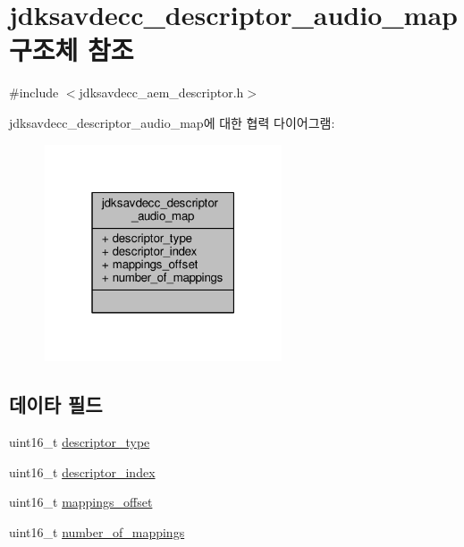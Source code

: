 \hypertarget{structjdksavdecc__descriptor__audio__map}{}\section{jdksavdecc\+\_\+descriptor\+\_\+audio\+\_\+map 구조체 참조}
\label{structjdksavdecc__descriptor__audio__map}


{\ttfamily \#include $<$jdksavdecc\+\_\+aem\+\_\+descriptor.\+h$>$}



jdksavdecc\+\_\+descriptor\+\_\+audio\+\_\+map에 대한 협력 다이어그램\+:
\nopagebreak
\begin{figure}[H]
\begin{center}
\leavevmode
\includegraphics[width=199pt]{structjdksavdecc__descriptor__audio__map__coll__graph}
\end{center}
\end{figure}
\subsection*{데이타 필드}
\begin{DoxyCompactItemize}
\item 
uint16\+\_\+t \hyperlink{structjdksavdecc__descriptor__audio__map_ab7c32b6c7131c13d4ea3b7ee2f09b78d}{descriptor\+\_\+type}
\item 
uint16\+\_\+t \hyperlink{structjdksavdecc__descriptor__audio__map_a042bbc76d835b82d27c1932431ee38d4}{descriptor\+\_\+index}
\item 
uint16\+\_\+t \hyperlink{structjdksavdecc__descriptor__audio__map_ac91a41273e32c7bf86ca390838721642}{mappings\+\_\+offset}
\item 
uint16\+\_\+t \hyperlink{structjdksavdecc__descriptor__audio__map_ac7db472c5622ef473d5d0a5c416d5531}{number\+\_\+of\+\_\+mappings}
\end{DoxyCompactItemize}



